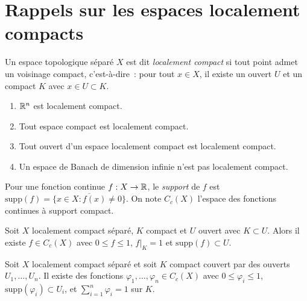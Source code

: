 \section{Rappels sur les espaces localement compacts}

\begin{definition}
Un espace topologique s\'epar\'e $X$ est dit \emph{localement compact}
si tout point admet un voisinage compact, c'est-\`a-dire~: pour tout $x \in X$, il existe
un ouvert $U$ et un compact $K$ avec $x \in U \subset K$.
\end{definition}

\begin{exemple}
\begin{enumerate}
    \item $\mathbb{R}^n$ est localement compact.
    \item Tout espace compact est localement compact.
    \item Tout ouvert d'un espace localement compact est localement compact.
    \item Un espace de Banach de dimension infinie n'est pas localement compact.
\end{enumerate}
\end{exemple}

\begin{definition}
Pour une fonction continue $f : X \to \mathbb{R}$, le \emph{support} de $f$ est
$\mathrm{supp}(f) = \overline{\{x \in X : f(x) \neq 0\}}$. On note
$C_c(X)$ l'espace des fonctions continues \`a support compact.
\end{definition}

\begin{lemme}
\label{lem:urysohn}
Soit $X$ localement compact s\'epar\'e, $K$ compact et $U$ ouvert avec
$K \subset U$. Alors il existe $f \in C_c(X)$ avec $0 \leq f \leq 1$,
$f|_K = 1$ et $\mathrm{supp}(f) \subset U$.
\end{lemme}

\begin{proposition}
\label{prop:partition_unite}
Soit $X$ localement compact s\'epar\'e et soit $K$ compact couvert par des ouverts
$U_1, \ldots, U_n$. Il existe des fonctions $\varphi_1, \ldots, \varphi_n \in C_c(X)$
avec $0 \leq \varphi_i \leq 1$, $\mathrm{supp}(\varphi_i) \subset U_i$, et
$\sum_{i=1}^n \varphi_i = 1$ sur $K$.
\end{proposition}


